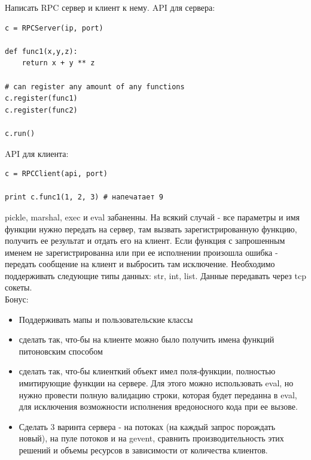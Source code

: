 \documentclass{article}
\begin{document}
\begin{flushleft}
Написать RPC сервер и клиент к нему.
API для сервера:
\begin{lstlisting}
c = RPCServer(ip, port)

def func1(x,y,z):
	return x + y ** z

# can register any amount of any functions
c.register(func1)
c.register(func2)

c.run()
\end{lstlisting}

API для клиента:
\begin{lstlisting}
c = RPCClient(api, port)

print c.func1(1, 2, 3) # напечатает 9
\end{lstlisting}

pickle, marshal, exec и eval  забаненны.
На всякий случай - все параметры и имя функции нужно передать на сервер, 
там вызвать зарегистрированную функцию, получить ее результат и отдать его на клиент.
Если функция с запрошенным именем не зарегистрированна или при ее 
исполнении произошла ошибка - передать сообщение на клиент и выбросить там исключение.
Необходимо поддерживать следующие типы данных: str, int, list.
Данные передавать через tcp сокеты. \\

Бонус:

\begin{itemize}
\item Поддерживать мапы и пользовательские классы
\item сделать так, что-бы на клиенте можно было получить имена функций питоновским способом
\item сделать так, что-бы клиенткий объект имел поля-функции, 
      полностью имитирующие функции на сервере.
      Для этого можно использовать eval, но нужно провести полную 
      валидацию строки, которая будет переданна в eval,
      для исключения возможности исполнения вредоносного кода при ее вызове.
\item Сделать 3 варинта сервера - на потоках (на каждый запрос порождать новый), 
    на пуле потоков и на gevent,
    сравнить производительность этих решений и объемы ресурсов в 
    зависимости от количества клиентов.
\end{itemize}
\end{flushleft}
\end{document}
